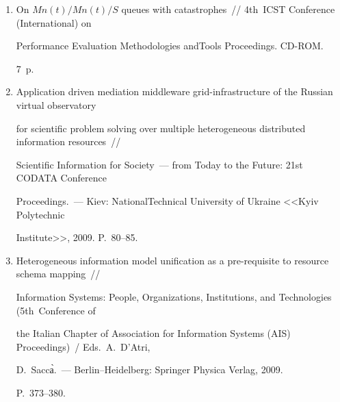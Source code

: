 \begin{enumerate}[1.]
{http://users.cs.\linebreak fiu.edu/\~{}taoli/kdd09-workshop/DMMT09-proceedings.pdf}.





\item {}  


On $Mn(t)/$\linebreak $Mn(t)/S$ queues with catastrophes~// 4th~ICST Conference (International) on 


Performance Evaluation Methodologies and\linebreak Tools Proceedings. CD-ROM.


7~p.





\item {}


Application driven mediation middleware grid-infrastructure of the Russian virtual observatory 


for scientific problem solving over multiple heterogeneous distributed information resources~// 


Scientific Information for Society~--- from Today to the Future: 21st \mbox{CODATA} Conference 


Proceedings.~--- Kiev: National\linebreak Technical University of Ukraine <<Kyiv Polytechnic 


Institute>>, 2009. P.~80--85.





\item{}


Heterogeneous information model unification as a pre-requisite to resource schema mapping~// 


Information Systems: People, Organizations, Institutions, and Technologies (5th~Conference of 


the Italian Chapter of Association for Information Systems (AIS) Proceedings)~/ Eds.\ A.~D'Atri, 


D.~Sacc\`{а}.~--- Berlin--Heidelberg: Springer Physica Verlag, 2009. 


P.~373--380.






\end{enumerate}
